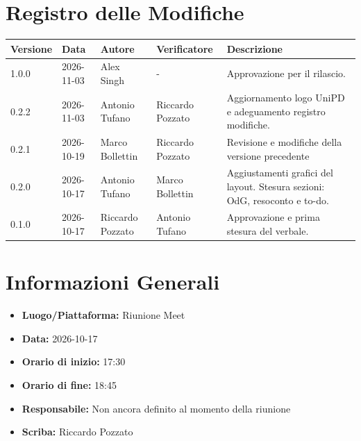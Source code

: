 \documentclass[a4paper, 11pt]{article}
\begin{document}
\section*{Registro delle Modifiche}
\vspace{0.5cm}
\begin{center}
\renewcommand{\arraystretch}{1.5}
\begin{tabularx}{\textwidth}{|l|l|l|l|X|}
\hline
\textbf{Versione} & \textbf{Data} & \textbf{Autore} & \textbf{Verificatore} & \textbf{Descrizione} \\ \hline
1.0.0 & 2026-11-03 & Alex Singh & - & Approvazione per il rilascio. \\ \hline
0.2.2 & 2026-11-03 & Antonio Tufano & Riccardo Pozzato & Aggiornamento logo UniPD e adeguamento registro modifiche. \\ \hline
0.2.1 & 2026-10-19 & Marco Bollettin & Riccardo Pozzato & Revisione e modifiche della versione precedente \\ \hline
0.2.0 & 2026-10-17 & Antonio Tufano & Marco Bollettin & Aggiustamenti grafici del layout. \newline Stesura sezioni: OdG, resoconto e to-do. \\ \hline
0.1.0 & 2026-10-17 & Riccardo Pozzato & Antonio Tufano & Approvazione e prima stesura del verbale. \\ \hline


\end{tabularx}
\end{center}

\newpage

\tableofcontents
\newpage

\section{Informazioni Generali}
\begin{itemize}
    \item \textbf{Luogo/Piattaforma:} Riunione Meet
    \item \textbf{Data:} 2026-10-17
    \item \textbf{Orario di inizio:} 17:30
    \item \textbf{Orario di fine:} 18:45
    \item \textbf{Responsabile:} Non ancora definito al momento della riunione
    \item \textbf{Scriba:} Riccardo Pozzato
\end{itemize}
\end{document}
